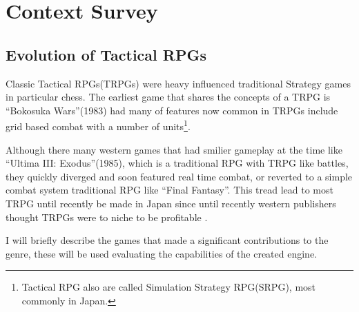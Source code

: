 
\section{Context Survey} 
\label{Context_Survey}

\subsection{Evolution of Tactical RPGs }
\label{sub:evolution_of_tactical_rpgs_}

Classic Tactical RPGs(TRPGs)  were heavy influenced traditional Strategy games in particular chess.  The earliest game that shares the concepts of a TRPG is ``Bokosuka Wars''(1983) had many of features now common in TRPGs include grid based combat with a number of units\cite{BokosukaWars}\footnote{Tactical RPG also are called Simulation Strategy RPG(SRPG),  most commonly in Japan.}. 

Although there many western games that had smilier gameplay at the time like ``Ultima III: Exodus''(1985), which is a traditional RPG with TRPG like battles, they quickly diverged and soon featured real time combat, or reverted to a simple combat system traditional RPG like ``Final Fantasy''.  This tread lead to most TRPG until recently be made in Japan since until recently western publishers  thought TRPGs were to niche to be profitable \cite{notrpg}. 

I will briefly describe  the games that made a significant contributions to the genre, these will be used evaluating the capabilities of the created engine.

